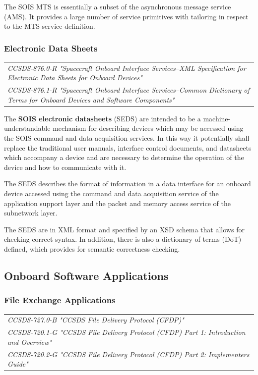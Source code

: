 The SOIS MTS is essentially a subset of the asynchronous message service (AMS). It provides a large number of service primitives with tailoring in respect to the MTS service definition.

\subsubsection{Electronic Data Sheets}

\begin{tabular}{l}
\textit{CCSDS-876.0-R "Spacecraft Onboard Interface Services--XML Specification for Electronic Data Sheets for Onboard Devices" \cite{}} \\
\textit{CCSDS-876.1-R "Spacecraft Onboard Interface Services--Common Dictionary of Terms for Onboard Devices and Software Components" \cite{}}
\end{tabular}

The \textbf{SOIS electronic datasheets} (SEDS) are intended to be a machine-understandable mechanism for describing devices which may be accessed using the SOIS command and data acquisition services. In this way it potentially shall replace the traditional user manuals, interface control documents, and datasheets which accompany a device and are necessary to determine the operation of the device and how to communicate with it.

The SEDS describes the format of information in a data interface for an onboard device accessed using the command and data acquisition service of the application support layer and the packet and memory access service of the subnetwork layer.

The SEDS are in XML format and specified by an XSD schema that allows for checking correct syntax. In addition, there is also a dictionary of terms (DoT) defined, which provides for semantic correctness checking. 

\subsection{Onboard Software Applications}
\label{sec:Onboard Software Applications}

\subsubsection{File Exchange Applications}

\begin{tabular}{l}
\textit{CCSDS-727.0-B "CCSDS File Delivery Protocol (CFDP)" \cite{CCSDS-727.0-B}} \\
\textit{CCSDS-720.1-G "CCSDS File Delivery Protocol (CFDP) Part 1: Introduction and Overview" \cite{CCSDS-720.1-G}} \\
\textit{CCSDS-720.2-G "CCSDS File Delivery Protocol (CFDP) Part 2: Implementers Guide" \cite{CCSDS-720.2-G}} \\
\end{tabular}

